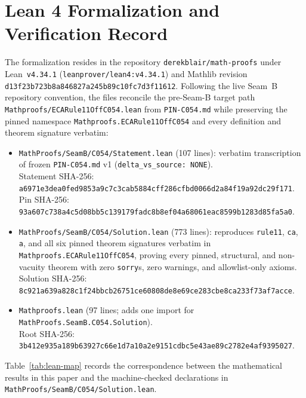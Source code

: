 \documentclass[11pt]{article}
\theoremstyle{definition}
\begin{document}
\section{Lean 4 Formalization and Verification Record}

The formalization resides in the repository \texttt{derekblair/math-proofs} under Lean~\texttt{v4.34.1} (\nolinkurl{leanprover/lean4:v4.34.1}) and Mathlib revision {\small\nolinkurl{d13f23b723b8a846827a245b89c10fc7d3f11612}}. Following the live Seam~B repository convention, the files reconcile the pre-Seam-B target path \nolinkurl{Mathproofs/ECARule11OffC054.lean} from \texttt{PIN-C054.md} while preserving the pinned namespace \nolinkurl{Mathproofs.ECARule11OffC054} and every definition and theorem signature verbatim:
\begin{itemize}\setlength{\itemsep}{2pt}
\item \nolinkurl{MathProofs/SeamB/C054/Statement.lean} (107 lines): verbatim transcription of frozen \texttt{PIN-C054.md} v1 (\texttt{delta\_vs\_source: NONE}).\\
Statement SHA-256: {\small\nolinkurl{a6971e3dea0fed9853a9c7c3cab5884cff286cfbd0066d2a84f19a92dc29f171}}.\\
Pin SHA-256: {\small\nolinkurl{93a607c738a4c5d08bb5c139179fadc8b8ef04a68061eac8599b1283d85fa5a0}}.
\item \nolinkurl{MathProofs/SeamB/C054/Solution.lean} (773 lines): reproduces \texttt{rule11}, \texttt{ca}, \texttt{a}, and all six pinned theorem signatures verbatim in \nolinkurl{Mathproofs.ECARule11OffC054}, proving every pinned, structural, and non-vacuity theorem with zero \texttt{sorry}s, zero warnings, and allowlist-only axioms.\\
Solution SHA-256: {\small\nolinkurl{8c921a639a828c1f24bbcb26751ce60808de8e69ce283cbe8ca233f73af7acce}}.
\item \nolinkurl{Mathproofs.lean} (97 lines; adds one import for \nolinkurl{MathProofs.SeamB.C054.Solution}).\\
Root SHA-256: {\small\nolinkurl{3b412e935a189b63927c66e1d7a10a2e9151cdbc5e43ae89c2782e4af9395027}}.
\end{itemize}

Table~\ref{tab:lean-map} records the correspondence between the mathematical results in this paper and the machine-checked declarations in \nolinkurl{MathProofs/SeamB/C054/Solution.lean}.
\end{document}
